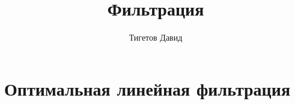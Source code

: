 \documentclass[a4paper,12pt]{book}
\begin{document}
\title{Фильтрация}
\author{Тигетов Давид}
\maketitle

\tableofcontents

\part{Оптимальная линейная фильтрация}















\end{document}
